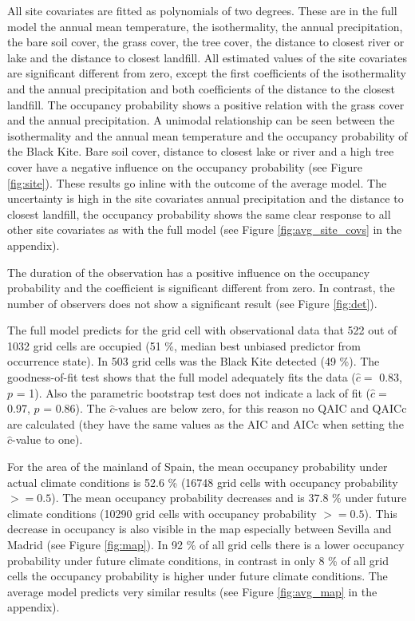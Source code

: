 \begin{multicols}{2}
All site covariates are fitted as polynomials of two degrees. These are in the full model the annual mean temperature, the isothermality, the annual precipitation, the bare soil cover, the grass cover, the tree cover, the distance to closest river or lake and the distance to closest landfill. All estimated values of the site covariates are significant different from zero, except the first coefficients of the isothermality and the annual precipitation and both coefficients of the distance to the closest landfill. The occupancy probability shows a positive relation with the grass cover and the annual precipitation. A unimodal relationship can be seen between the isothermality and the annual mean temperature and the occupancy probability of the Black Kite. Bare soil cover, distance to closest lake or river and a high tree cover have a negative influence on the occupancy probability (see Figure \ref{fig:site}). These results go inline with the outcome of the average model. The uncertainty is high in the site covariates annual precipitation and the distance to closest landfill, the occupancy probability shows the same clear response to all other site covariates as with the full model (see Figure \ref{fig:avg_site_covs} in the appendix). 

The duration of the observation has a positive influence on the occupancy probability and the coefficient is significant different from zero. In contrast, the number of observers does not show a significant result (see Figure \ref{fig:det}).     

The full model predicts for the grid cell with observational data that 522 out of 1032 grid cells are occupied (51 \%, median best unbiased predictor from occurrence state). In 503 grid cells was the Black Kite detected (49 \%). The \textcite{MacKenzie2004} goodness-of-fit test shows that the full model adequately fits the data ($\hat{c} = $ 0.83, $p$ = 1). Also the parametric bootstrap test does not indicate a lack of fit ($\hat{c} = $ 0.97, $p$ = 0.86). The $\hat{c}$-values are below zero, for this reason no QAIC and QAICc are calculated (they have the same values as the AIC and AICc when setting the $\hat{c}$-value to one). 

For the area of the mainland of Spain, the mean occupancy probability under actual climate conditions is 52.6 \% (16748 grid cells with occupancy probability $>= 0.5$). The mean occupancy probability decreases and is 37.8 \% under future climate conditions (10290 grid cells with occupancy probability $>= 0.5$). This decrease in occupancy is also visible in the map especially between Sevilla and Madrid (see Figure \ref{fig:map}). In 92 \% of all grid cells there is a lower occupancy probability under future climate conditions, in contrast in only 8 \% of all grid cells the occupancy probability is higher under future climate conditions. The average model predicts very similar results (see Figure \ref{fig:avg_map} in the appendix).  




\end{multicols}
